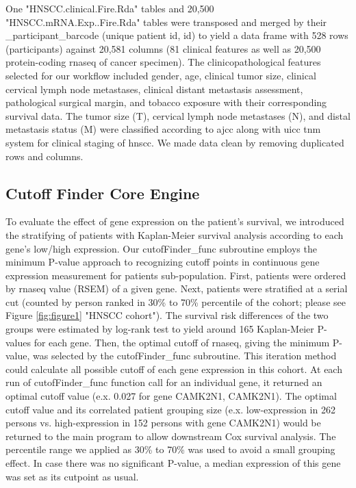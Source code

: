 \documentclass[cancers,article,submit,moreauthors,pdftex]{Definitions/mdpi}
\begin{document}
\begin{paracol}{2}
One "HNSCC.clinical.Fire.Rda" tables and 20,500 "HNSCC.mRNA.Exp.\newline
[GeneName].Fire.Rda" tables were transposed and merged by their \newline
\_participant\_barcode (unique patient \acrlong{id}, \acrshort{id}) to yield a data frame with 528 rows (participants) against 20,581 columns (81 clinical features as well as 20,500 protein-coding \acrshort{rnaseq} of cancer specimen).
The clinicopathological features selected for our workflow included gender, age, clinical tumor size, clinical cervical lymph node metastases, clinical distant metastasis assessment, pathological surgical margin, and tobacco exposure with their corresponding survival data.
The tumor size (T), cervical lymph node metastases (N), and distal metastasis status (M) were classified according to \acrfull{ajcc}\cite{Amin2017} along with \acrfull{uicc}\cite{Brierley2016} \acrshort{tnm} system for clinical staging of \acrshort{hnscc}.
We made data clean by removing duplicated rows and columns.

\subsection*{Cutoff Finder Core Engine}

To evaluate the effect of gene expression on the patient's survival, we introduced the stratifying of patients with Kaplan-Meier survival analysis according to each gene's low/high expression.
Our cutofFinder\_func subroutine employs the minimum P-value approach to recognizing cutoff points in continuous gene expression measurement for patients sub-population.
First, patients were ordered by \acrshort{rnaseq} value (RSEM) of a given gene. Next, patients were stratified at a serial cut (counted by person ranked in 30\% to 70\% percentile of the cohort; please see Figure \ref{fig:figure1} "HNSCC cohort"). The survival risk differences of the two groups were estimated by log-rank test to yield around 165 Kaplan-Meier P-values for each gene.
Then, the optimal cutoff of \acrshort{rnaseq}, giving the minimum P-value, was selected by the cutofFinder\_func subroutine.
This iteration method could calculate all possible cutoff of each gene expression in this cohort. At each run of cutofFinder\_func function call for an individual gene, it returned an optimal cutoff value (e.x. 0.027 for gene \acrlong{CAMK2N1}, \acrshort{CAMK2N1}). The optimal cutoff value and its correlated patient grouping size (e.x. low-expression in 262 persons vs. high-expression in 152 persons with gene \acrshort{CAMK2N1}) would be returned to the main program to allow downstream Cox survival analysis. The percentile range we applied as 30\% to 70\% was used to avoid a small grouping effect\cite{Miller1982}\cite{Mizuno2009a}.
In case there was no significant P-value, a median expression of this gene was set as its cutpoint as usual.


\end{paracol}
\end{document}
